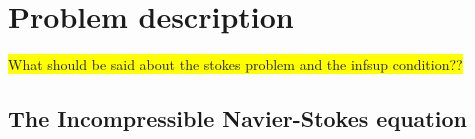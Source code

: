 
\chapter{Problem description} %

\label{description} %


\colorbox{yellow}{What should be said about the stokes problem and the infsup condition??}
\section{The Incompressible Navier-Stokes equation}

